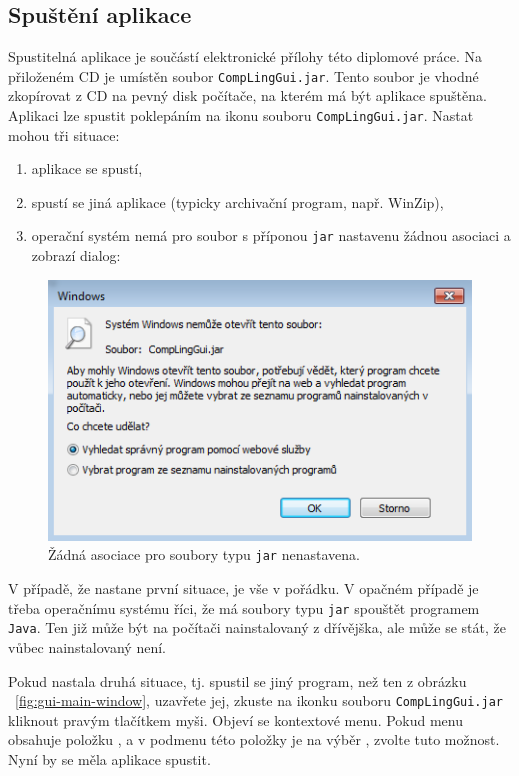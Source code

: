 \documentclass[dp.tex]{subfiles}
\begin{document}
\subsection{Spuštění aplikace}

Spustitelná aplikace je součástí elektronické přílohy této diplomové práce. Na přiloženém CD je umístěn soubor \texttt{CompLingGui.jar}. Tento soubor je vhodné zkopírovat z CD na pevný disk počítače, na kterém má být aplikace spuštěna. Aplikaci lze spustit poklepáním na ikonu souboru \texttt{CompLingGui.jar}. Nastat mohou tři situace:

\begin{enumerate}
\item aplikace se spustí,
\item spustí se jiná aplikace (typicky archivační program, např. WinZip),
\item operační systém nemá pro soubor s příponou \texttt{jar} nastavenu žádnou asociaci a zobrazí dialog:
\end{enumerate}

\raggedbottom

\begin{figure}[H]
	\centering
	\includegraphics[max width=\textwidth,keepaspectratio=true] {imgs-60-aplikace/no-association}
	\caption{Žádná asociace pro soubory typu \texttt{jar} nenastavena.}
	\label{fig:no-association}
\end{figure}

V případě, že nastane první situace, je vše v pořádku. V opačném případě je třeba operačnímu systému říci, že má soubory typu \texttt{jar} spouštět programem \texttt{Java}. Ten již může být na počítači nainstalovaný z dřívějška, ale může se stát, že vůbec nainstalovaný není.

Pokud nastala druhá situace, tj. spustil se jiný program, než ten z obrázku ~\ref{fig:gui-main-window}, uzavřete jej, zkuste na ikonku souboru \texttt{CompLingGui.jar} kliknout pravým tlačítkem myši. Objeví se kontextové menu. Pokud menu obsahuje položku , a v podmenu této položky je na výběr , zvolte tuto možnost. Nyní by se měla aplikace spustit.
\end{document}
